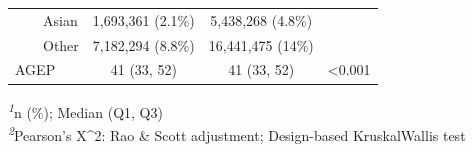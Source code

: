 \begin{table}[t]
\begin{tabular*}{\linewidth}{@{\extracolsep{\fill}}lccc}
    Asian & 1,693,361 (2.1\%) & 5,438,268 (4.8\%) &  \\ 
    Other & 7,182,294 (8.8\%) & 16,441,475 (14\%) &  \\ 
AGEP & 41 (33, 52) & 41 (33, 52) & <0.001 \\ 
\bottomrule
\end{tabular*}
\begin{minipage}{\linewidth}
\textsuperscript{\textit{1}}n (\%); Median (Q1, Q3)\\
\textsuperscript{\textit{2}}Pearson's X\^{}2: Rao \& Scott adjustment; Design-based KruskalWallis test\\
\end{minipage}
\end{table}

